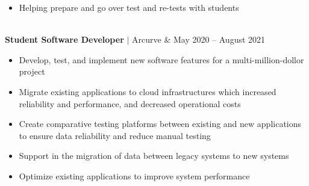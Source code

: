 \documentclass[11pt]{article}
\newenvironment{compactList}
{
  \begin{itemize}
    \setlength{\itemsep}{0pt}
    \setlength{\parskip}{0pt}
}
{\end{itemize}}
\begin{document}
\begin{tabularx}{\textwidth\setlength{\extrarowheight}{5pt}}
{\begin{minipage}{0.85\paperwidth}
\begin{compactList}
        \item Helping prepare and go over test and re-tests with students
      \end{compactList}
    \end{minipage}
  }
  \\
  \textbf{Student Software Developer} $\vert$ Arcurve                     & May 2020 – August 2021 \\
  {
    \begin{minipage}{0.85\paperwidth}
      \begin{compactList}
        \item Develop, test, and implement new software features for a multi-million-dollor project
        \item Migrate existing applications to cloud infrastructures which increased reliability and performance, and decreased operational costs
        \item Create comparative testing platforms between existing and new applications to ensure data reliability and reduce manual testing
        \item Support in the migration of data between legacy systems to new systems
        \item Optimize existing applications to improve system performance
      \end{compactList}
    \end{minipage}
  }
\end{tabularx}
\vspace{-10pt}
\end{document}
